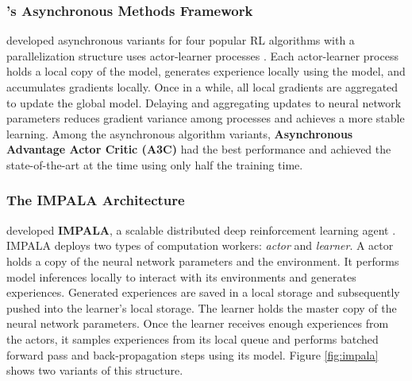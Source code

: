 \subsubsection{'s Asynchronous Methods Framework}
\citeauthor{AsynchronousMethodsDeep_Mnih.Badia.ea_2016} developed asynchronous variants for four popular RL algorithms with a parallelization structure uses actor-learner processes \cite{AsynchronousMethodsDeep_Mnih.Badia.ea_2016}.
Each actor-learner process holds a local copy of the model, generates experience locally using the model, and accumulates gradients locally.
Once in a while, all local gradients are aggregated to update the global model.
Delaying and aggregating updates to neural network parameters reduces gradient variance among processes and achieves a more stable learning.
Among the asynchronous algorithm variants, \textbf{Asynchronous Advantage Actor Critic (A3C)} had the best performance and achieved the state-of-the-art at the time using only half the training time.

\subsubsection{The IMPALA Architecture} \label{sec:impala}
\citeauthor{IMPALAScalableDistributed_Espeholt.Soyer.ea_2018} developed \textbf{IMPALA}, a scalable distributed deep reinforcement learning agent \cite{IMPALAScalableDistributed_Espeholt.Soyer.ea_2018}.
IMPALA deploys two types of computation workers: \textit{actor} and \textit{learner}.
A actor holds a copy of the neural network parameters and the environment.
It performs model inferences locally to interact with its environments and generates experiences.
Generated experiences are saved in a local storage and subsequently pushed into the learner's local storage.
The learner holds the master copy of the neural network parameters.
Once the learner receives enough experiences from the actors, it samples experiences from its local queue and performs batched forward pass and back-propagation steps using its model.
Figure \ref{fig:impala} shows two variants of this structure.

